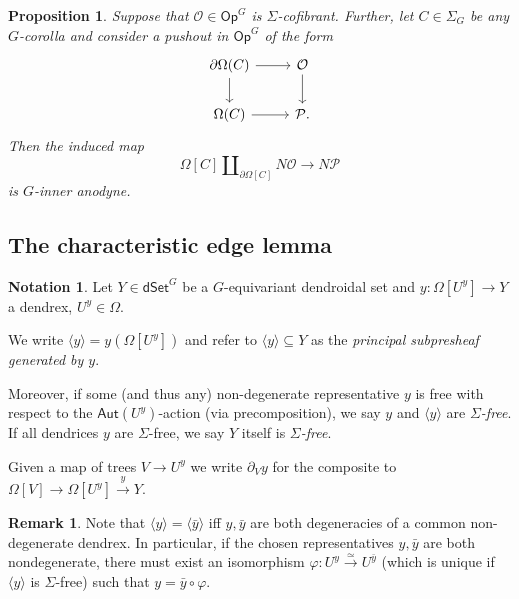 \documentclass[a4paper,10pt
,draft
]{article}%
\numberwithin{equation}{section}
\numberwithin{figure}{section}
\newtheorem{proposition}[equation]{Proposition}%
\theoremstyle{definition} %
\newtheorem{remark}[equation]{Remark}%
\newtheorem{notation}[equation]{Notation}%
\newcommand{\1}{\ensuremath{\mathbbm 1}}%
\begin{document}
\begin{proposition}\label{KEYPR PROP OLD}
	Suppose that $\mathcal{O} \in \mathsf{Op}^{G}$
	is $\Sigma$-cofibrant.
	Further, let $C \in \Sigma_G$ be any $G$-corolla and consider 
	a pushout in $\mathsf{Op}^{G}$ of the form
	\begin{equation}\label{PUSHOUTPROP EQ}
	\begin{tikzcd}
	\partial \Omega(C) \ar{r} \ar{d} & \mathcal{O} \ar{d}
	\\
	\Omega(C) \ar{r} & \mathcal{P}.
	\end{tikzcd}
	\end{equation}
	Then the induced map
	\begin{equation}\label{ANODYNE MAP}
	\Omega[C] \amalg_{\partial \Omega[C]} N\mathcal{O} \to N\mathcal{P}
	\end{equation}
	is $G$-inner anodyne.
\end{proposition}


\subsection{The characteristic edge lemma}


\begin{notation}
	Let $Y \in \mathsf{dSet}^G$ be a $G$-equivariant dendroidal set and 
	$y \colon \Omega[U^y] \to Y$
	a dendrex, $U^y \in \Omega$.
	
	We write $\langle y \rangle = y\left(  \Omega[U^y] \right)$
	and refer to
	$\langle y \rangle \subseteq Y$
	as the \emph{principal subpresheaf generated by $y$}.
	
	Moreover, if some (and thus any)
	non-degenerate representative $y$ is free 
	with respect to the $\mathsf{Aut}(U^y)$-action (via precomposition),
	we say $y$ and $\langle y \rangle$ are \emph{$\Sigma$-free}.
	If all dendrices $y$ are $\Sigma$-free, we say $Y$ itself is \textit{$\Sigma$-free}.
	
	Given a map of trees $V \to U^y$ we write $\partial_V y$ for the composite to $\Omega[V] \to \Omega[U^y] \xrightarrow{y} Y$.
\end{notation}



\begin{remark}
	Note that
	$\langle y \rangle = \langle \bar{y} \rangle$
	iff $y,\bar{y}$ are both degeneracies of a common non-degenerate dendrex.
	In particular, if the chosen representatives $y,\bar{y}$ are both nondegenerate,
	there must exist an isomorphism
	$\varphi \colon U^y \xrightarrow{\simeq} U^{\bar{y}}$
	(which is unique if 
	$\langle y \rangle$ is $\Sigma$-free)
	such that $y= \bar{y} \circ \varphi$.
	
\end{remark}
\end{document}
